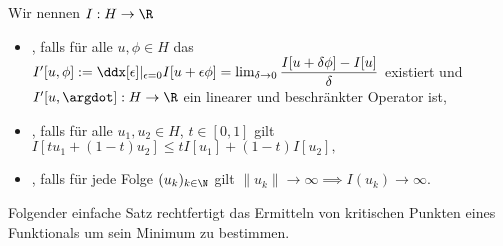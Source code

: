 \documentclass{mythesis}
\begin{document}
\begin{definition} \label{definition:min_stuff}
    Wir nennen $I: H \to \R$
    \begin{itemize}
	\item
	    ,
            falls für alle $u, \phi \in H$ das 
	    \begin{math}
		I'[u, \phi]
		:= \ddx[\epsilon]|_{\epsilon = 0} I[u + \epsilon \phi]
		= \lim_{\delta \to 0} \dfrac{I[u + \delta \phi] - I[u]}{\delta}
	    \end{math}
	    existiert und $I'[u, \argdot]: H \to \R$ ein linearer und beschränkter Operator ist,
        \item
	    ,
	    falls für alle $u_1, u_2 \in H$, $t \in [0,1]$ gilt
	    \begin{math}
		I[t u_1 + (1-t) u_2]
		\le tI[u_1] + (1-t)I[u_2],
	    \end{math}
	\item
	    ,
	    falls für jede Folge $(u_k)_{k\in\N}$ gilt
	    \begin{math}
		\|u_k\| \to \infty \implies I(u_k) \to \infty.
	    \end{math}
    \end{itemize}
\end{definition}

Folgender einfache Satz rechtfertigt das Ermitteln von kritischen Punkten eines Funktionals um sein Minimum zu bestimmen.
\end{document}
